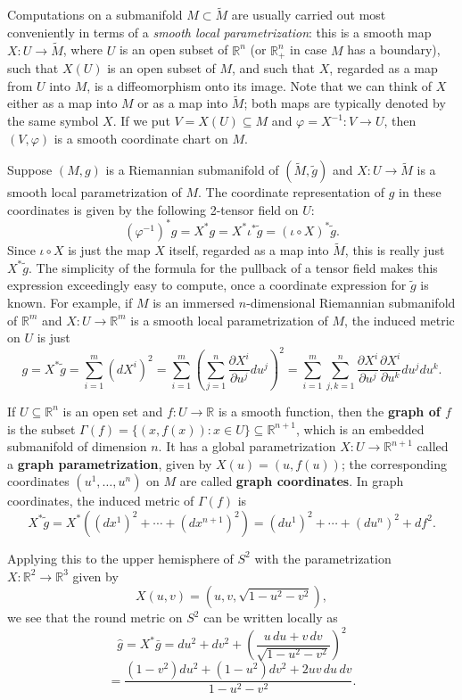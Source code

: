 Computations on a submanifold $M \subset \widetilde{M}$ are usually carried out most conveniently in terms of a \emph{smooth local parametrization}: this is a smooth map $X : U \to \widetilde{M}$, where $U$ is an open subset of $\mathbb{R}^n$ (or $\mathbb{R}^n_+$ in case $M$ has a boundary), such that $X(U)$ is an open subset of $M$, and such that $X$, regarded as a map from $U$ into $M$, is a diffeomorphism onto its image. Note that we can think of $X$ either as a map into $M$ or as a map into $\widetilde{M}$; both maps are typically denoted by the same symbol $X$. If we put $V = X(U) \subseteq M$ and $\varphi = X^{-1} : V \to U$, then $(V, \varphi)$ is a smooth coordinate chart on $M$.

Suppose $(M, g)$ is a Riemannian submanifold of $(\widetilde{M}, \widetilde{g})$ and $X : U \to \widetilde{M}$ is a smooth local parametrization of $M$. The coordinate representation of $g$ in these coordinates is given by the following 2-tensor field on $U$:
\[
(\varphi^{-1})^* g = X^* g = X^* \iota^* \widetilde{g} = (\iota \circ X)^* \widetilde{g}.
\]
Since $\iota \circ X$ is just the map $X$ itself, regarded as a map into $\tilde{M}$, this is really just $X^*\tilde{g}$. The simplicity of the formula for the pullback of a tensor field makes this expression exceedingly easy to compute, once a coordinate expression for $\tilde{g}$ is known. For example, if $M$ is an immersed $n$-dimensional Riemannian submanifold of $\mathbb{R}^m$ and $X : U \to \mathbb{R}^m$ is a smooth local parametrization of $M$, the induced metric on $U$ is just
\[
g = X^*\tilde{g} = \sum_{i=1}^m (dX^i)^2 = \sum_{i=1}^m \left(\sum_{j=1}^n \frac{\partial X^i}{\partial u^j} du^j\right)^2 = \sum_{i=1}^m \sum_{j,k=1}^n \frac{\partial X^i}{\partial u^j}\frac{\partial X^i}{\partial u^k} du^j du^k.
\]

\begin{example}
\label{ex:metrics-in-graph-coordinates}

If $U \subseteq \mathbb{R}^n$ is an open set and $f : U \to \mathbb{R}$ is a smooth function, then the \textbf{graph of $f$} is the subset $\Gamma(f) = \{(x, f(x)) : x \in U\} \subseteq \mathbb{R}^{n+1}$, which is an embedded submanifold of dimension $n$. It has a global parametrization $X : U \to \mathbb{R}^{n+1}$ called a \textbf{graph parametrization}, given by $X(u) = (u, f(u))$; the corresponding coordinates $(u^1,\ldots,u^n)$ on $M$ are called \textbf{graph coordinates}. In graph coordinates, the induced metric of $\Gamma(f)$ is
\[
X^*\tilde{g} = X^*\left((dx^1)^2 + \cdots + (dx^{n+1})^2\right) = (du^1)^2 + \cdots + (du^n)^2 + df^2.
\]

Applying this to the upper hemisphere of $S^2$ with the parametrization $X : \mathbb{R}^2 \to \mathbb{R}^3$ given by
\[
X(u,v) = \left(u, v, \sqrt{1-u^2-v^2}\right),
\]
we see that the round metric on $S^2$ can be written locally as
\[
\hat{g} = X^*\bar{g} = du^2 + dv^2 + \left(\frac{u\,du + v\,dv}{\sqrt{1-u^2-v^2}}\right)^2
\]
\[
= \frac{(1-v^2) du^2 + (1-u^2) dv^2 + 2uv\,du\,dv}{1-u^2-v^2}.
\]
\end{example}

